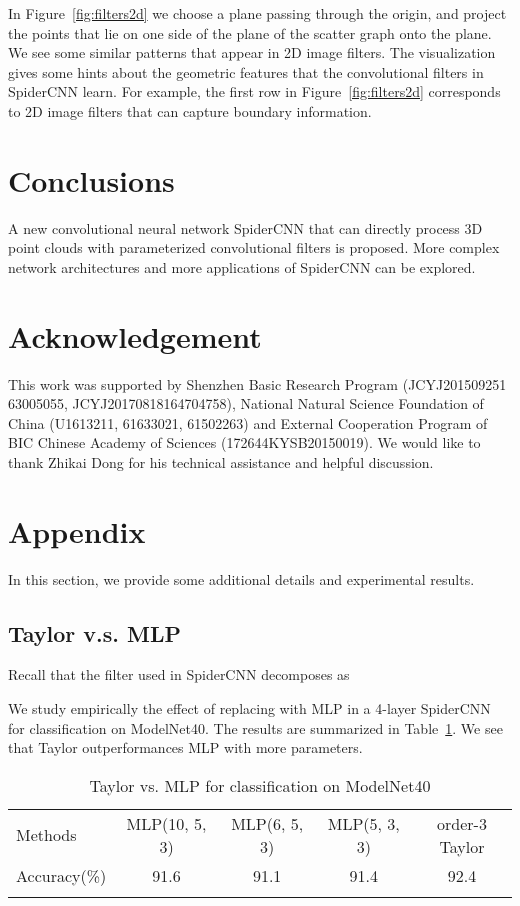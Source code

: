 \documentclass[runningheads]{llncs}
\begin{document}
In Figure~\ref{fig:filters2d} we choose a plane passing through the origin, and project the points that lie on one side of the plane of the scatter graph onto the plane. We see some similar patterns that appear in 2D image filters. The visualization gives some hints about the geometric features that the convolutional filters in SpiderCNN learn. For example, the first row in  Figure~\ref{fig:filters2d} corresponds to 2D image filters that can capture boundary information. 


\section{Conclusions}

A new convolutional neural network SpiderCNN that can directly process 3D point clouds with parameterized convolutional filters is proposed. More complex network architectures and more applications of SpiderCNN can be explored.  


\section*{Acknowledgement}
This work was  supported by Shenzhen Basic Research Program (JCYJ201509251 63005055,  JCYJ20170818164704758), National Natural Science Foundation of
China (U1613211, 61633021, 61502263) and External Cooperation Program of BIC Chinese Academy of Sciences (172644KYSB20150019). We would like to thank Zhikai Dong for his technical assistance and helpful discussion. 

\section{Appendix}
In this section, we provide some additional details and experimental results. 

\subsection{Taylor v.s. MLP}

Recall that the filter used in SpiderCNN decomposes as 

We study empirically the effect of replacing  with MLP in a 4-layer SpiderCNN for classification on ModelNet40. The results are summarized in Table~\ref{table:mlp}. We see that Taylor outperformances MLP with more parameters.

\setlength{\tabcolsep}{4pt}
\begin{table}
\begin{center}
\caption{Taylor vs. MLP for classification on ModelNet40 }
\label{table:mlp}
\begin{tabular}{l|cccc}
\hline\noalign{\smallskip}
Methods & MLP(10, 5, 3) & MLP(6, 5, 3) & MLP(5, 3, 3) & order-3 Taylor\\
\noalign{\smallskip}
\hline
\noalign{\smallskip}
 Accuracy(\%) & 91.6 & 91.1 & 91.4 & 92.4
\\
\noalign{\smallskip}
\hline
\end{tabular}
\end{center}
\end{table}
\setlength{\tabcolsep}{1.4pt}
\end{document}
